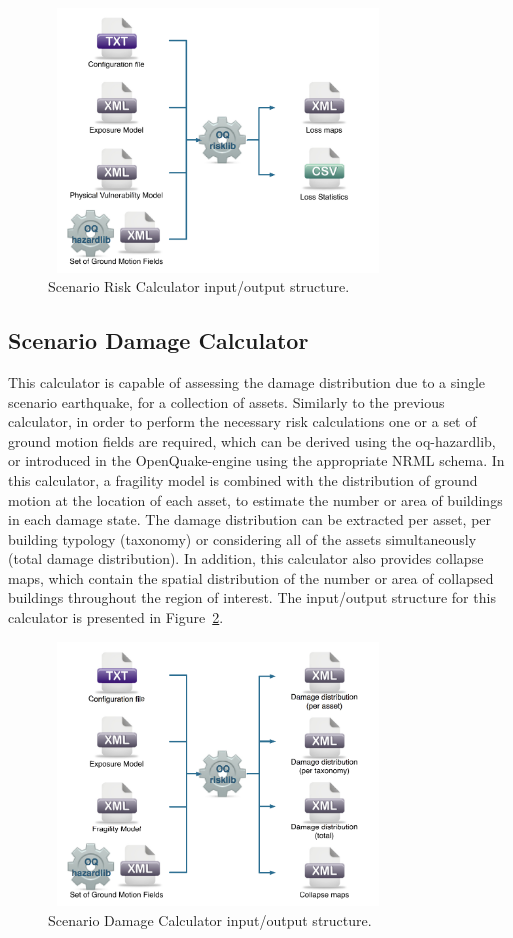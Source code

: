 \begin{figure}[ht]
\centering
\includegraphics[width=9cm,height=7cm]{figures/risk/ScenarioRisk.pdf}
\caption{Scenario Risk Calculator input/output structure.}
\label{fig:ScnRisk}
\end{figure}

\subsection{Scenario Damage Calculator}
This calculator is capable of assessing the damage distribution due to a single scenario earthquake, for a collection of assets. Similarly to the previous calculator, in order to perform the necessary risk calculations one or a set of ground motion fields are required, which can be derived using the oq-hazardlib, or introduced in the OpenQuake-engine using the appropriate NRML schema.
In this calculator, a fragility model is combined with the distribution of ground motion at the location of each asset, to estimate the number or area of buildings in each damage state. The damage distribution can be extracted per asset, per building typology (taxonomy) or considering all of the assets simultaneously (total damage distribution). In addition, this calculator also provides collapse maps, which contain the spatial distribution of the number or area of collapsed buildings throughout the region of interest. The input/output structure for this calculator is presented in Figure~\ref{fig:ScnDamage}.

\begin{figure}[ht]
\centering
\includegraphics[width=9cm,height=7cm]{figures/risk/ScenarioDamage.pdf}
\caption{Scenario Damage Calculator input/output structure.}
\label{fig:ScnDamage}
\end{figure}

